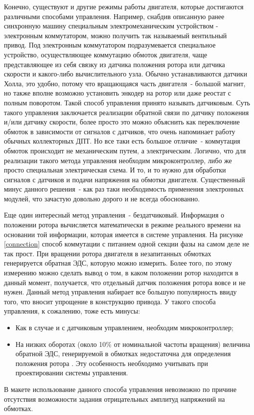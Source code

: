 Конечно, существуют и другие режимы работы двигателя, которые достигаются 
различными способами управления. Например, снабдив описанную ранее синхронную
машину специальным электромеханическим устройством - электронным коммутатором, 
можно получить так называемый вентильный привод. Под электронным коммутатором
подразумевается специальное устройство, осуществляющее коммутацию обмоток двигателя, 
чаще представляющее из себя связку
из датчика положения ротора или датчика скорости и какого-либо вычислительного узла. Обычно устанавливаются 
датчики Холла, это удобно, потому что вращающаяся часть двигателя~- большой магнит, но также
вполне возможно установить энкодер на ротор или даже реостат с полным поворотом. 
Такой способ управления принято называть датчиковым. Суть такого управления 
заключается реализации обратной связи по датчику положения и/или датчику скорости, более просто 
это можно объяснить как переключение обмоток в зависимости от сигналов с датчиков, что очень напоминает работу 
обычных коллекторных ДПТ. Но все таки есть
большое отличие~- коммутация обмоток происходит не механическим путем, а электрическим.
Логично, что для реализации такого метода управления необходим микроконтроллер, либо же просто
специальная электрическая схема. И то, и то нужно для
обработки сигналов с датчиков и подачи напряжения на обмотки двигателя.
Существенный минус данного решения~- как раз таки необходимость
применения электронных модулей, что зачастую довольно дорого и не всегда обоснованно. 

Еще один интересный метод управления~- бездатчиковый. Информация о положении ротора 
вычисляется математически в режиме реального времени на основании той 
информации, которая имеется в системе управления. На рисунке \ref{connection} способ коммутации
с питанием одной секции фазы на самом деле не так прост. При вращении ротора двигателя в 
незапитанных обмотках генерируется обратная ЭДС, которую можно измерить. 
Более того, по этому измерению можно сделать вывод о том, в каком положении ротор 
находится в данный момент, получается, что отдельный датчик положения ротора вовсе и не нужен.
Данный метод управления набирает все большую популярность ввиду того, что вносит
упрощение в конструкцию привода.
У такого способа управления, к сожалению, тоже есть минусы:
\begin{itemize}
  \item Как в случае и с датчиковым управлением, необходим микроконтроллер;
  \item На низких оборотах (около 10\% от номинальной частоты вращения) величина обратной ЭДС,
генерируемой в обмотках недостаточна для определения положения ротора \cite{Инжреш}. Эту особенность
необходимо учитывать при проектировании системы управления.
\end{itemize}
В макете использование данного способа управления невозможно по причине отсутствия возможности 
задания отрицательных амплитуд напряжений на обмотках.

